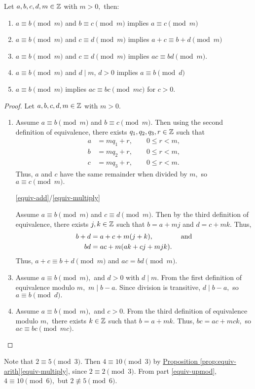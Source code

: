 \documentclass{ximera}
\begin{document}
\begin{proposition}\label{prop:equiv-arith}%
 Let $a,b,c,d,m\in\mathbb Z$ with $m>0,$ then:
\begin{enumerate}
\item $a\equiv b \pmod{m}$ and $b\equiv c \pmod{m}$ implies $a\equiv c \pmod{m}$
\item\label{equiv-add} $a\equiv b \pmod{m}$ and $c\equiv d \pmod{m}$ implies $a+c \equiv b+d \pmod{m}$ 
\item\label{equiv-multiply} $a\equiv b\pmod{m}$ and $c\equiv d \pmod{m}$ implies $ac\equiv bd \pmod{m}$.
\item $a\equiv b \pmod{m}$ and $d\mid m$, $d>0$ implies $a\equiv b \pmod{d}$
\item\label{equiv-upmod} $a\equiv b \pmod{m}$ implies $ac\equiv bc \pmod{mc}$ for $c>0$.
\end{enumerate}
\end{proposition}
\begin{proof}
  Let $a,b,c,d,m\in\mathbb Z$ with $m>0.$
  
\begin{enumerate}
  \item Assume $a\equiv b \pmod{m}$ and $b\equiv c \pmod{m}.$ Then using the second definition of equivalence, there exists $q_1,q_2,q_3,r\in\mathbb Z$ such that 
  \begin{align*}
    a&=mq_1+r, \qquad 0\leq r<m,\\
    b&=mq_2+r, \qquad 0\leq r<m,\\
    c&=mq_3+r, \qquad 0\leq r<m. 
  \end{align*}
  Thus, $a$ and $c$ have the same remainder when divided by $m,$ so $a\equiv c\pmod m.$

  \item[\ref{equiv-add}/\ref{equiv-multiply}] \addtocounter{enumi}{2}
  Assume $a\equiv b \pmod{m}$ and $c\equiv d \pmod{m}.$ Then by the third definition of equivalence, there exists $j,k\in\mathbb Z$ such that $b=a+mj$ and $d=c+mk.$ Thus, 
  \begin{align*}
    b+d&=a+c+m(j+k), \qquad\qquad\textnormal{and}\\
    bd &= ac+m(ak+cj+mjk).
  \end{align*}
  Thus, $a+c\equiv b+d\pmod m$ and $ac=bd\pmod m.$

  \item Assume $a\equiv b \pmod{m},$ and $d>0$ with $d\mid m.$ From the first definition of equivalence modulo $m,$ $m\mid b-a$. Since division is transitive, $d\mid b-a,$ so $a\equiv b\pmod d.$

  \item Assume $a\equiv b \pmod{m},$ and $c>0.$ From the third definition of equivalence modulo $m,$ there exists $k\in\mathbb Z$ such that $b=a+mk.$ Thus, $bc=ac+mck,$ so $ac\equiv bc \pmod{mc}.$ \qedhere
\end{enumerate}
\end{proof}

\begin{example}
Note that $2\equiv 5 \pmod 3$. Then $4\equiv 10 \pmod 3$ by \hyperref[equiv-multiply]{Proposition \ref{prop:equiv-arith}\ref{equiv-multiply}}, since $2\equiv 2\pmod 3.$ From part \ref{equiv-upmod}, $4\equiv 10 \pmod 6,$ but $2\not\equiv 5\pmod 6.$ 
\end{example}
\end{document}
